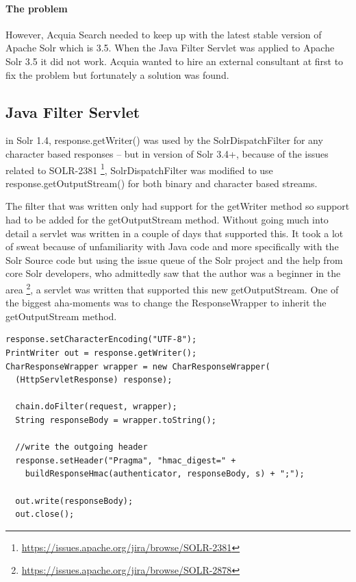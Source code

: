 \paragraph{The problem} However, Acquia Search needed to keep up with the latest stable version of Apache Solr which is 3.5. When the Java Filter Servlet was applied to Apache Solr 3.5 it did not work. 
Acquia wanted to hire an external consultant at first to fix the problem but fortunately a solution was found.

\subsection{Java Filter Servlet}
in Solr 1.4, response.getWriter() was used by the SolrDispatchFilter for any character based responses – but in version of Solr 3.4+, because of the issues related to SOLR-2381 \footnote{\url{https://issues.apache.org/jira/browse/SOLR-2381}}, SolrDispatchFilter was modified to use response.getOutputStream() for both binary and character based streams.

The filter that was written only had support for the getWriter method so support had to be added for the getOutputStream method. Without going much into detail a servlet was written in a couple of days that supported this. It took a lot of sweat because of unfamiliarity with Java code and more specifically with the Solr Source code but using the issue queue of the Solr project and the help from core Solr developers, who admittedly saw that the author was a beginner in the area \footnote{\url{https://issues.apache.org/jira/browse/SOLR-2878}}, a servlet was written that supported this new getOutputStream. One of the biggest aha-moments was to change the ResponseWrapper to inherit the getOutputStream method. 
\begin{verbatim}
response.setCharacterEncoding("UTF-8");
PrintWriter out = response.getWriter();
CharResponseWrapper wrapper = new CharResponseWrapper(
  (HttpServletResponse) response);
 
  chain.doFilter(request, wrapper);
  String responseBody = wrapper.toString();
 
  //write the outgoing header
  response.setHeader("Pragma", "hmac_digest=" +
    buildResponseHmac(authenticator, responseBody, s) + ";");
 
  out.write(responseBody);
  out.close();
\end{verbatim}
\caption{A snippet of the original Acquia HMAC Filter for Solr 1.4}

